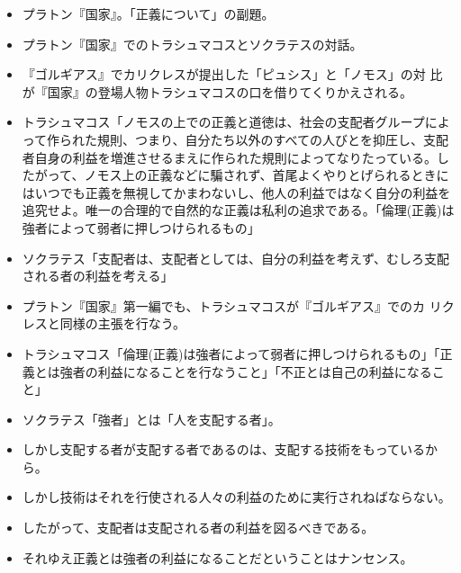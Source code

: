 \documentclass{jsarticle}
\begin{document}
\begin{itemize}

\item プラトン『国家』。「正義について」の副題。

 \item プラトン『国家』でのトラシュマコスとソクラテスの対話。

\item 『ゴルギアス』でカリクレスが提出した「ピュシス」と「ノモス」の対
  比が『国家』の登場人物トラシュマコスの口を借りてくりかえされる。

\item トラシュマコス「ノモスの上での正義と道徳は、社会の支配者グループによって作られた規則、つまり、自分たち以外のすべての人びとを抑圧し、支配者自身の利益を増進させるまえに作られた規則によってなりたっている。したがって、ノモス上の正義などに騙されず、首尾よくやりとげられるときにはいつでも正義を無視してかまわないし、他人の利益ではなく自分の利益を追究せよ。唯一の合理的で自然的な正義は私利の追求である。「倫理(正義)は強者によって弱者に押しつけられるもの」

\item ソクラテス「支配者は、支配者としては、自分の利益を考えず、むしろ支配される者の利益を考える」

\item プラトン『国家』第一編でも、トラシュマコスが『ゴルギアス』でのカ
  リクレスと同様の主張を行なう。

\item トラシュマコス「倫理(正義)は強者によって弱者に押しつけられるもの」「正義とは強者の利益になることを行なうこと」「不正とは自己の利益になること」

\item ソクラテス「強者」とは「人を支配する者」。


\item しかし支配する者が支配する者であるのは、支配する技術をもっているから。


\item しかし技術はそれを行使される人々の利益のために実行されねばならない。

\item したがって、支配者は支配される者の利益を図るべきである。

\item それゆえ正義とは強者の利益になることだということはナンセンス。


\end{itemize}
\end{document}
